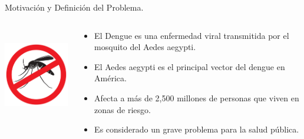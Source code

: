 \begin{frame}[t]{Motivación y Definición del Problema.}
    \begin{columns}[c]
        \begin{column}[c]{4cm}
            \includegraphics[height=4cm]{./graphics/mosquito.jpg}
        \end{column}

        \begin{column}[c]{6cm} %
         \begin{itemize}
            \item El Dengue es una enfermedad viral transmitida por el mosquito del Aedes aegypti.
            \item El Aedes aegypti es el principal vector del dengue en América.
            \item Afecta a más de 2,500 millones de personas que viven en zonas de riesgo.
            \item Es considerado un grave problema para la salud pública.
            \end{itemize}
        \end{column}
    \end{columns}
\end{frame}


